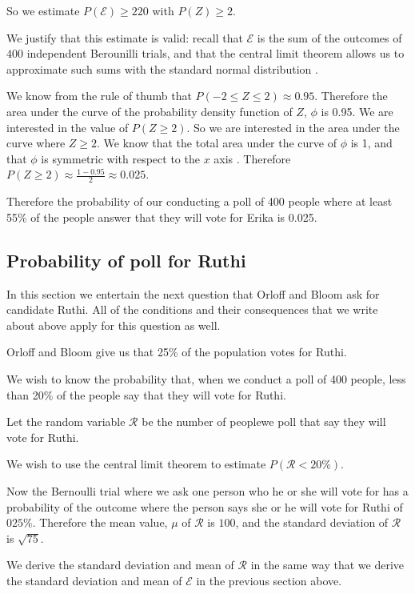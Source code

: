 \documentclass[a4paper,11pt]{article}
\begin{document}
So we estimate $P\left(\mathcal{E} \right) \geq 220$ with
$P\left( Z \right) \geq 2$.

We justify that this estimate is valid: recall that $\mathcal{E}$ is the
sum of the outcomes of $400$ independent Berounilli trials, and
that the central limit theorem allows us to approximate such
sums with the standard normal distribution \cite{reading6b}.

We know from the rule of thumb \cite{reading5c} that
$P\left( -2 \leq Z \leq 2 \right) \approx 0.95$.  Therefore the area
under the curve of the probability density function of $Z$,
$\phi$ is 0.95.  We are interested in the value of $P\left(Z \geq 2 \right)$. So
we are interested in the area under the curve where $Z \geq 2$. We know that
the total area under the curve of $\phi$ is 1, and that $\phi$ is
symmetric with respect to the $x$ axis \cite{reading5c}.  Therefore
$P\left(Z \geq 2 \right) \approx \frac{1-0.95}{2} \approx 0.025$.

Therefore the probability of our conducting a poll of 400 people
where at least 55\% of the people answer that they will  vote
for Erika is 0.025.

\subsection{Probability of poll for Ruthi}
In this section we entertain the next question that Orloff
and Bloom ask for candidate Ruthi. All of the conditions
and their consequences that we write about above apply for
this question as well.

Orloff and Bloom give us that 25\% of the population
votes for Ruthi.

We wish to know the probability that, when we conduct a
poll of 400 people, less than 20\% of the people say that
they will vote for Ruthi.

Let the random variable $\mathcal{R}$ be the number of peoplewe  poll that say
they will vote for Ruthi.

We wish to use the central limit theorem to estimate $P\left( \mathcal{R} < 20\% \right)$.

Now the Bernoulli trial where we ask one person who he or she will
vote for has a probability of the outcome where the person says
she or he will vote for Ruthi of $025\%$.  Therefore the mean value, $\mu$
of $\mathcal{R}$ is $100$, and the standard deviation of $\mathcal{R}$ is
$\sqrt{75}$.

We derive the standard deviation and mean of $\mathcal{R}$
in the same way that we derive the standard deviation and mean of
$\mathcal{E}$ in the previous section above.
\end{document}
